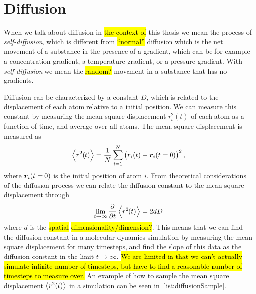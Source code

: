 \section{Diffusion}
When we talk about diffusion in \hl{the context of} this thesis we mean the process of \emph{self-diffusion}, which is different from \hl{``normal''} diffusion which is the net movement of a substance in the presence of a gradient, which can be for example a concentration gradient, a temperature gradient, or a pressure gradient. With \emph{self-diffusion} we mean the \hl{random?} movement in a substance that has no gradients.

Diffusion can be characterized by a constant $D$, which is related to the displacement of each atom relative to a initial position. We can measure this constant by measuring the mean square displacement $r_i^2(t)$ of each atom as a function of time, and average over all atoms. The mean square displacement is measured as
\begin{align*}
    \Braket{r^2(t)} = \frac{1}{N} \sum_{i=1}^N \left( \boldsymbol{r}_i(t) - \boldsymbol{r}_i(t=0) \right)^2,
\end{align*}
where $\boldsymbol{r}_i(t=0)$ is the initial position of atom $i$. From theoretical considerations of the diffusion process we can relate the diffusion constant to the mean square displacement through\cite[Section~4.4.1]{frenkel2001understanding}
\begin{align}
    \lim_{t\rightarrow \infty}\dpd{}{t}\Braket{r^2(t)} = 2dD\label{eq:diffusion_derivative}
\end{align}
where $d$ is the \hl{spatial} \hl{dimensionality/dimension?}. This means that we can find the diffusion constant in a molecular dynamics simulation by measuring the mean square displacement for many timesteps, and find the slope of this data as the diffusion constant in the limit $t\rightarrow \infty$. \hl{We are limited in that we can't actually simulate infinite number of timesteps, but have to find a reasonable number of timesteps to measure over.} An example of how to sample the mean square displacement $\Braket{r^2(t)}$ in a simulation can be seen in \cref{list:diffusionSample}.
%
